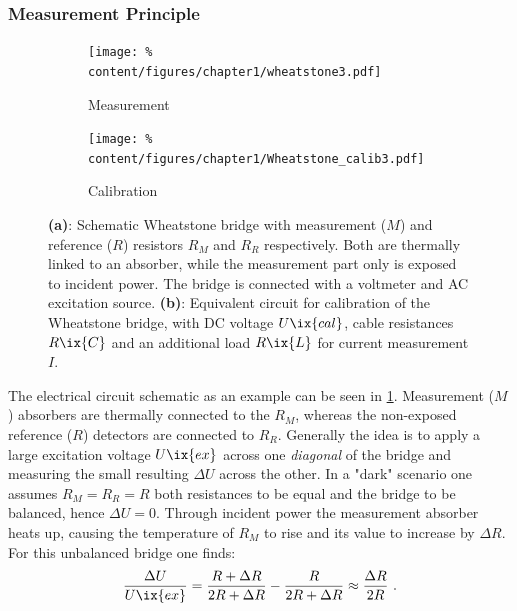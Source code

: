             \subsubsection*{Measurement Principle}%
%
                \begin{figure}[t]%
                    \centering%
                    \begin{subfigure}{0.48\textwidth}%
                        \texttt{[image: \%
                            content/figures/chapter1/wheatstone3.pdf]}%
                        \caption{Measurement}\label{fig:wheatstone}%
                    \end{subfigure}%
                    \hfill%
                    \begin{subfigure}{0.48\textwidth}%
                        \texttt{[image: \%
                            content/figures/chapter1/Wheatstone\_calib3.pdf]}%
                        \caption{Calibration}\label{fig:wheatstone_calib}%
                    \end{subfigure}%
                    \caption{\textbf{(a)}: Schematic Wheatstone bridge with measurement ($M$) and reference ($R$) resistors $R_{M}$ and $R_{R}$ respectively. Both are thermally linked to an absorber, while the measurement part only is exposed to incident power. The bridge is connected with a voltmeter and AC excitation source. \textbf{(b)}: Equivalent circuit for calibration of the Wheatstone bridge, with DC voltage $U\ix{cal}$, cable resistances $R\ix{C}$ and an additional load $R\ix{L}$ for current measurement $I$.}\label{fig:wheatstone_two}%
                \end{figure}%
%
                The electrical circuit schematic as an example can be seen in \cref{fig:wheatstone}. Measurement ($M$) absorbers are thermally connected to the $R_{M}$, whereas the non-exposed reference ($R$) detectors are connected to $R_{R}$. Generally the idea is to apply a large excitation voltage $U\ix{ex}$ across one \textit{diagonal} of the bridge and measuring the small resulting $\Delta U$ across the other. In a "dark" scenario one assumes $R_{M}=R_{R}=R$ both resistances to be equal and the bridge to be balanced, hence $\Delta U=0$. Through incident power the measurement absorber heats up, causing the temperature of $R_{M}$ to rise and its value to increase by $\Delta R$. For this unbalanced bridge one finds:%
%
                \begin{align}%
                    \frac{\Delta U}{U\ix{ex}}=\frac{R+\Delta R}{2R+\Delta R}-\frac{R}{2R+\Delta R}\approx\frac{\Delta R}{2R}\,\,.\label{eq:base_wheatstone}%
                \end{align}%

